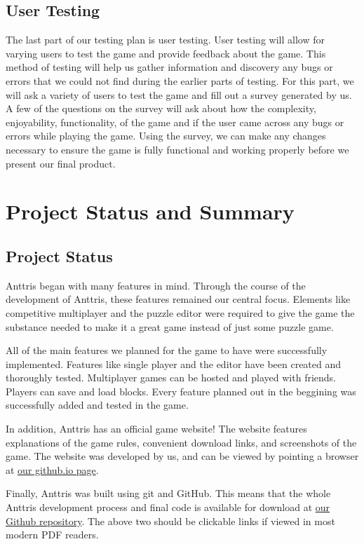 \documentclass[12pt]{article}
\begin{document}
\subsection{User Testing}
The last part of our testing plan is user testing. User testing will allow for varying users to test the game and provide feedback about the game. This method of testing will help us gather information and discovery any bugs or errors that we could not find during the earlier parts of testing. For this part, we will ask a variety of users to test the game and fill out a survey generated by us. A few of the questions on the survey will ask about how the complexity, enjoyability, functionality, of the game and if the user came across any bugs or errors while playing the game. Using the survey, we can make any changes necessary to ensure the game is fully functional and working properly before we present our final product.

\section{Project Status and Summary}
\subsection{Project Status} %
Anttris began with many features in mind. Through the course of the development of Anttris, these features remained our central focus. Elements like competitive multiplayer and the puzzle editor were required to give the game the substance needed to make it a great game instead of just some puzzle game.

All of the main features we planned for the game to have were successfully implemented. Features like single player and the editor have been created and thoroughly tested. Multiplayer games can be hosted and played with friends. Players can save and load blocks. Every feature planned out in the beggining was successfully added and tested in the game.

In addition, Anttris has an official game website! The website features explanations of the game rules, convenient download links, and screenshots of the game. The website was developed by us, and can be viewed by pointing a browser at \href{http://gamewizards.github.io}{our github.io page}.


Finally, Anttris was built using git and GitHub. This means that the whole Anttris development process and final code is available for download at \href{http://github.com/gamewizards/anttris/}{our Github repository}. The above two should be clickable links if viewed in most modern PDF readers. 
\end{document}
